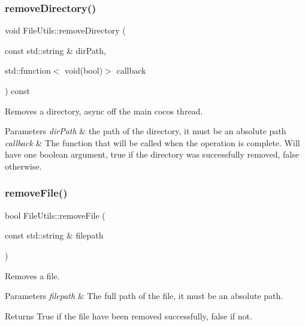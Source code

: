 \subsubsection{\texorpdfstring{remove\+Directory()}{removeDirectory()}\hspace{0.1cm}{\footnotesize\ttfamily [3/3]}}
{\footnotesize\ttfamily void File\+Utils\+::remove\+Directory (\begin{DoxyParamCaption}\item[{const std\+::string \&}]{dir\+Path,  }\item[{std\+::function$<$ void(bool)$>$}]{callback }\end{DoxyParamCaption}) const\hspace{0.3cm}{\ttfamily [virtual]}}

Removes a directory, async off the main cocos thread.


\begin{DoxyParams}{Parameters}
{\em dir\+Path} & the path of the directory, it must be an absolute path \\
\hline
{\em callback} & The function that will be called when the operation is complete. Will have one boolean argument, true if the directory was successfully removed, false otherwise. \\
\hline
\end{DoxyParams}
\mbox{\label{classFileUtils_aee725bf84f7bc707f9a94543d75b70fb}} 
\subsubsection{\texorpdfstring{remove\+File()}{removeFile()}\hspace{0.1cm}{\footnotesize\ttfamily [1/3]}}
{\footnotesize\ttfamily bool File\+Utils\+::remove\+File (\begin{DoxyParamCaption}\item[{const std\+::string \&}]{filepath }\end{DoxyParamCaption})\hspace{0.3cm}{\ttfamily [virtual]}}

Removes a file.


\begin{DoxyParams}{Parameters}
{\em filepath} & The full path of the file, it must be an absolute path. \\
\hline
\end{DoxyParams}
\begin{DoxyReturn}{Returns}
True if the file have been removed successfully, false if not. 
\end{DoxyReturn}


